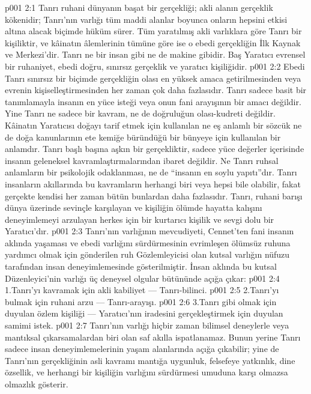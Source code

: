 \vs p001 2:1 Tanrı ruhani dünyanın başat bir gerçekliği; akli alanın gerçeklik kökenidir; Tanrı’nın varlığı tüm maddi alanlar boyunca onların hepsini etkisi altına alacak biçimde hüküm sürer. Tüm yaratılmış akli varlıklara göre Tanrı bir kişiliktir, ve kâinatın âlemlerinin tümüne göre ise o ebedi gerçekliğin İlk Kaynak ve Merkezi’dir. Tanrı ne bir insan gibi ne de makine gibidir. Baş Yaratıcı evrensel bir ruhaniyet, ebedi doğru, sınırsız gerçeklik ve yaratıcı kişiliğidir.
\vs p001 2:2 Ebedi Tanrı sınırsız bir biçimde gerçekliğin olası en yüksek amaca getirilmesinden veya evrenin kişiselleştirmesinden her zaman çok daha fazlasıdır. Tanrı sadece basit bir tanımlamayla insanın en yüce isteği veya onun fani arayışının bir amacı değildir. Yine Tanrı ne sadece bir kavram, ne de doğruluğun olası\hyp{}kudreti değildir. Kâinatın Yaratıcısı doğayı tarif etmek için kullanılan ne eş anlamlı bir sözcük ne de doğa kanunlarının ete kemiğe büründüğü bir bünyeye için kullanılan bir anlamdır. Tanrı başlı başına aşkın bir gerçekliktir, sadece yüce değerler içerisinde insanın geleneksel kavramlaştırmalarından ibaret değildir. Ne Tanrı ruhsal anlamların bir psikolojik odaklanması, ne de “insanın en soylu yapıtı”dır. Tanrı insanların akıllarında bu kavramların herhangi biri veya hepsi bile olabilir, fakat gerçekte kendisi her zaman bütün bunlardan daha fazlasıdır. Tanrı, ruhani barışı dünya üzerinde sevinçle karşılayan ve kişiliğin ölümde hayatta kalışını deneyimlemeyi arzulayan herkes için bir kurtarıcı kişilik ve sevgi dolu bir Yaratıcı’dır.
\vs p001 2:3 Tanrı’nın varlığının mevcudiyeti, Cennet’ten fani insanın aklında yaşaması ve ebedi varlığını sürdürmesinin evrimleşen ölümsüz ruhuna yardımcı olmak için gönderilen ruh Gözlemleyicisi olan kutsal varlığın nüfuzu tarafından insan deneyimlemesinde gösterilmiştir. İnsan aklında bu kutsal Düzenleyici’nin varlığı üç deneysel olgular bütününde açığa çıkar:
\vs p001 2:4 1.\bibnobreakspace Tanrı’yı kavramak için akli kabiliyet --- Tanrı\hyp{}bilinci.
\vs p001 2:5 2.\bibnobreakspace Tanrı’yı bulmak için ruhani arzu --- Tanrı\hyp{}arayışı.
\vs p001 2:6 3.\bibnobreakspace Tanrı gibi olmak için duyulan özlem kişiliği --- Yaratıcı’nın iradesini gerçekleştirmek için duyulan samimi istek.
\vs p001 2:7 Tanrı’nın varlığı hiçbir zaman bilimsel deneylerle veya mantıksal çıkarsamalardan biri olan saf akılla ispatlanamaz. Bunun yerine Tanrı sadece insan deneyimlemelerinin yaşam alanlarında açığa çıkabilir; yine de Tanrı’nın gerçekliğinin asli kavramı mantığa uygunluk, felsefeye yatkınlık, dine özsellik, ve herhangi bir kişiliğin varlığını sürdürmesi umuduna karşı olmazsa olmazlık gösterir.
